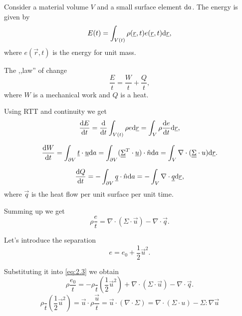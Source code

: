 \documentclass[../main.tex]{subfiles}
\begin{document}
    Consider a material volume $V$ and a small surface element $\mathrm{d} a$.
    The energy is given by 
    \begin{displaymath}
      E(t) = \int_{V (t)} \rho (\underline{r} ,t ) e (\underline{r}, t) \mathrm{d} \underline{r} ,
    \end{displaymath}
    where $e (\vec r, t)$ is the energy for unit mass.

    The ,,law'' of change
    \begin{displaymath}
      \dfrac{E}{t} = \dfrac{W}{t} + \dfrac{Q}{t},
    \end{displaymath}
    where $W$ is a mechanical work and $Q$ is a heat.

    Using RTT and continuity we get
    \begin{displaymath}
      \frac{\mathrm{d} E}{\mathrm{d} t} = \frac{\mathrm{d} }{\mathrm{d} t} \int_{V(t)} \rho e \mathrm{d} \underline{r} = \int_V \rho \frac{\mathrm{d} e}{\mathrm{d} t} \mathrm{d} \underline{r},
    \end{displaymath}
    
    \begin{displaymath}
      \frac{\mathrm{d} W}{\mathrm{d} t} = \int_{\partial V } \underline{t} \cdot \underline{u} \mathrm{d} a 
      = \int_{\partial V} (\underline{\underline{{\Sigma}}}^T \cdot \underline{u} ) \cdot \hat n  \mathrm{d} a 
      = \int_V \nabla \cdot ( \underline{\underline{{\Sigma}}} \cdot u) \mathrm{d} \underline{r}.
    \end{displaymath}

    \begin{displaymath}
      \frac{\mathrm{d} Q}{\mathrm{d} t} = - \int_{\partial V} \underline{q} \cdot  \hat n \mathrm{d} a = - \int_V \nabla \cdot \underline{q} \mathrm{d} \underline{r},
    \end{displaymath}
    where $\vec q$ is the heat flow per unit surface per unit time. %

    Summing up we get
    \begin{equation}
      \rho \dfrac{ e}{t} = \nabla \cdot ( \Sigma \cdot \vec u) - \nabla \cdot \vec q.
      \label{eq:2.3}
    \end{equation}

    Let's introduce the separation 
    \begin{displaymath}
      e = e_0 + \frac{1}{2} \vec u^2.
    \end{displaymath}

    Substituting it into \ref{eq:2.3} we obtain
    \begin{displaymath}
      \rho \dfrac{e_0}{t} = - \rho \dfrac{}{t} \left( \frac{1}{2} \vec u^2 \right) + \nabla \cdot (\Sigma \cdot \vec u ) - \nabla \cdot \vec q.
    \end{displaymath}
    \begin{displaymath}
      \rho \dfrac{}{t} \left( \frac{1}{2} \vec u ^2  \right) 
      = \vec u \cdot \rho \dfrac{\vec u}{t} 
      = \vec u \cdot ( \nabla \cdot \Sigma) 
      = \nabla \cdot ( \Sigma \cdot u) - \Sigma :\nabla \vec u %
    \end{displaymath}
    
\end{document}
